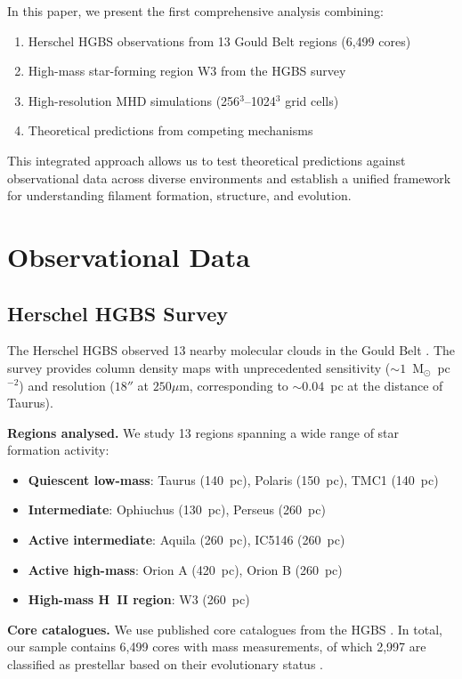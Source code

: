 \documentclass{mnras}
\begin{document}
In this paper, we present the first comprehensive analysis combining:
\begin{enumerate}
  \item Herschel HGBS observations from 13 Gould Belt regions (6,499 cores)
  \item High-mass star-forming region W3 from the HGBS survey
  \item High-resolution MHD simulations (256$^3$--1024$^3$ grid cells)
  \item Theoretical predictions from competing mechanisms
\end{enumerate}

This integrated approach allows us to test theoretical predictions against observational data across diverse environments and establish a unified framework for understanding filament formation, structure, and evolution.

\section{Observational Data}
\label{sec:data}

\subsection{Herschel HGBS Survey}

The Herschel HGBS observed 13 nearby molecular clouds in the Gould Belt \citep{Andre2016}. The survey provides column density maps with unprecedented sensitivity ($\sim 1$~M$_\odot$~pc$^{-2}$) and resolution ($18''$ at $250\mu$m, corresponding to $\sim 0.04$~pc at the distance of Taurus).

\textbf{Regions analysed.} We study 13 regions spanning a wide range of star formation activity:
\begin{itemize}
  \item \textbf{Quiescent low-mass}: Taurus (140~pc), Polaris (150~pc), TMC1 (140~pc)
  \item \textbf{Intermediate}: Ophiuchus (130~pc), Perseus (260~pc)
  \item \textbf{Active intermediate}: Aquila (260~pc), IC5146 (260~pc)
  \item \textbf{Active high-mass}: Orion A (420~pc), Orion B (260~pc)
  \item \textbf{High-mass H~II region}: W3 (260~pc)
\end{itemize}

\textbf{Core catalogues.} We use published core catalogues from the HGBS \citep{Konyves2015, Konyves2010}. In total, our sample contains 6,499 cores with mass measurements, of which 2,997 are classified as prestellar based on their evolutionary status \citep{Konyves2015}.
\end{document}
